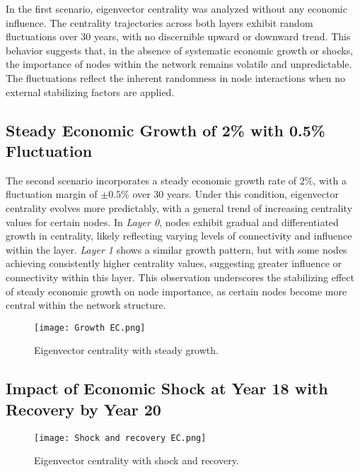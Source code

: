 \documentclass{article} %
\begin{document}
In the first scenario, eigenvector centrality was analyzed without any economic influence. The centrality trajectories across both layers exhibit random fluctuations over 30 years, with no discernible upward or downward trend. This behavior suggests that, in the absence of systematic economic growth or shocks, the importance of nodes within the network remains volatile and unpredictable. The fluctuations reflect the inherent randomness in node interactions when no external stabilizing factors are applied.


\subsection{Steady Economic Growth of 2\% with 0.5\% Fluctuation}



The second scenario incorporates a steady economic growth rate of 2\%, with a fluctuation margin of $\pm0.5\%$ over 30 years. Under this condition, eigenvector centrality evolves more predictably, with a general trend of increasing centrality values for certain nodes. In \textit{Layer 0}, nodes exhibit gradual and differentiated growth in centrality, likely reflecting varying levels of connectivity and influence within the layer. \textit{Layer 1} shows a similar growth pattern, but with some nodes achieving consistently higher centrality values, suggesting greater influence or connectivity within this layer. This observation underscores the stabilizing effect of steady economic growth on node importance, as certain nodes become more central within the network structure.
    \begin{figure}[h]
    \begin{center}
        \texttt{[image: Growth EC.png]}
    \end{center}
    \caption{Eigenvector centrality with steady growth.}
    \end{figure}


\subsection{Impact of Economic Shock at Year 18 with Recovery by Year 20}

\begin{figure}[h]
\begin{center}
    \texttt{[image: Shock and recovery EC.png]}
\end{center}
\caption{Eigenvector centrality with shock and recovery.}
\end{figure}
\end{document}

